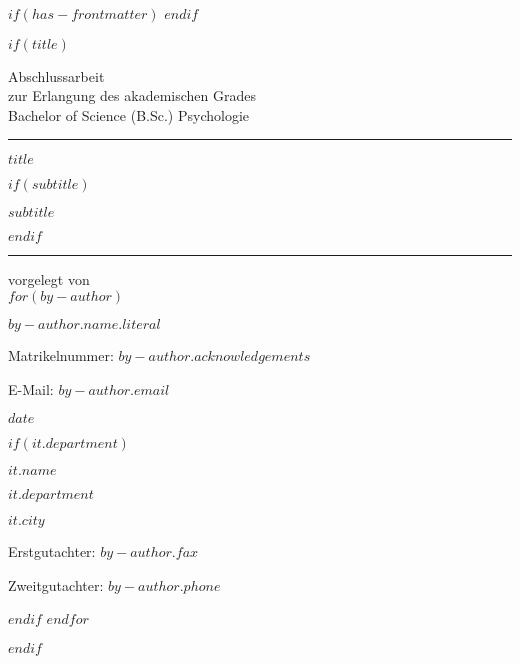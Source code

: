 $if(has-frontmatter)$
\frontmatter
$endif$

$if(title)$
\thispagestyle{empty}
{\centering
Abschlussarbeit \\
zur Erlangung des akademischen Grades \\
Bachelor of Science (B.Sc.) Psychologie \\
\vspace*{10mm}
\hrule
\vspace*{15mm}
{\large\bfseries $title$ \par}
$if(subtitle)$
{\large\bfseries $subtitle$ \par}
$endif$

\vspace*{15mm}
\hrule
\vspace*{10mm}
vorgelegt von  \\ 
$for(by-author)$
{\large\bfseries $by-author.name.literal$ \par}
\smallskip
{Matrikelnummer: $by-author.acknowledgements$ \par}
{E-Mail: $by-author.email$ \par}

\bigskip 

{\textmd\large $date$ \par}

$if(it.department)$
{\textmd\large $it.name$ \par}
{\textmd\large $it.department$ \par}
{\textmd\large $it.city$ \par}

\bigskip\bigskip \bigskip

{Erstgutachter: $by-author.fax$ \par}
{Zweitgutachter: $by-author.phone$ \par}
$endif$
$endfor$

\vspace*{10mm}


}
$endif$